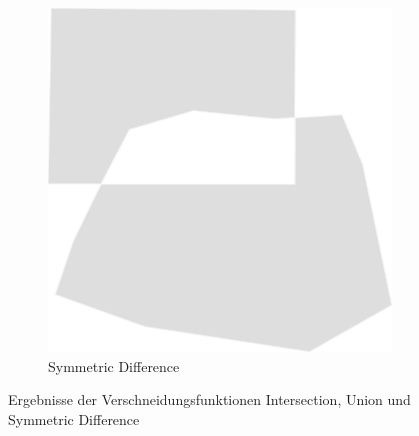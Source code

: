 \documentclass{beamer}
\begin{document}
\begin{frame}
\begin{figure}
\begin{subfigure}{.3\textwidth}
  \includegraphics[width=.7\linewidth]{../Abbildungen/st_symdifference.png}
  \caption{Symmetric Difference}
\end{subfigure}
\caption{Ergebnisse der Verschneidungsfunktionen Intersection, Union und Symmetric Difference}
\end{figure}
\end{frame}
\end{document}
